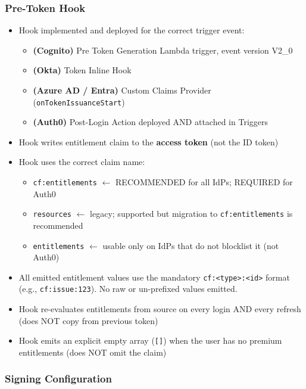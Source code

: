 \subsubsection*{Pre-Token Hook}

\begin{itemize}[label=$\square$, leftmargin=2em]
  \item Hook implemented and deployed for the correct trigger event:
    \begin{itemize}[label=$\square$, leftmargin=2em]
      \item \textbf{(Cognito)} Pre Token Generation Lambda trigger, event version V2\_0
      \item \textbf{(Okta)} Token Inline Hook
      \item \textbf{(Azure AD / Entra)} Custom Claims Provider
        (\texttt{onTokenIssuanceStart})
      \item \textbf{(Auth0)} Post-Login Action deployed AND attached in Triggers
    \end{itemize}
  \item Hook writes entitlement claim to the \textbf{access token} (not the ID token)
  \item Hook uses the correct claim name:
    \begin{itemize}[label=$\square$, leftmargin=2em]
      \item \texttt{cf:entitlements} $\leftarrow$ RECOMMENDED for all IdPs; REQUIRED for
        Auth0
      \item \texttt{resources} $\leftarrow$ legacy; supported but migration to
        \texttt{cf:entitlements} is recommended
      \item \texttt{entitlements} $\leftarrow$ usable only on IdPs that do not blocklist
        it (not Auth0)
    \end{itemize}
  \item All emitted entitlement values use the mandatory \texttt{cf:<type>:<id>} format
    (e.g., \texttt{cf:issue:123}). No raw or un-prefixed values emitted.
  \item Hook re-evaluates entitlements from source on every login AND every refresh
    (does NOT copy from previous token)
  \item Hook emits an explicit empty array (\texttt{[]}) when the user has no premium
    entitlements (does NOT omit the claim)
\end{itemize}

\subsubsection*{Signing Configuration}

